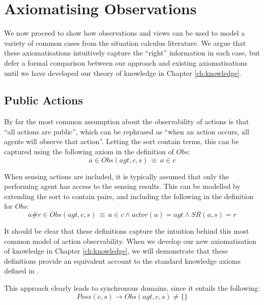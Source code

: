 \section{Axiomatising Observations\label{sec:Observations:Axiomatising-simple}}

We now proceed to show how observations and views can be used to model
a variety of common cases from the situation calculus literature.
We argue that these axiomatisations intuitively capture the {}``right''
information in each case, but defer a formal comparison between our
approach and existing axiomatisations until we have developed our
theory of knowledge in Chapter \ref{ch:knowledge}.


\subsection{Public Actions}

By far the most common assumption about the observability of actions
is that {}``all actions are public'', which can be rephrased as
{}``when an action occurs, all agents will observe that action''.
Letting the sort contain terms, this
can be captured using the following axiom in the definition of $Obs$:\begin{equation}
a\in Obs(agt,c,s)\,\equiv\, a\in c\label{eq:Observations:ObsStd1}\end{equation}


When sensing actions are included, it is typically assumed that only
the performing agent has access to the sensing results. This can be
modelled by extending the  sort to contain 
pairs, and including the following in the definition for $Obs$:\begin{equation}
a\#r\in Obs(agt,c,s)\,\equiv\, a\in c\wedge actor(a)=agt\wedge SR(a,s)=r\label{eq:Observations:ObsStd2}\end{equation}


It should be clear that these definitions capture the intuition behind
this most common model of action observability. When we develop our
new axiomatisation of knowledge in Chapter \ref{ch:knowledge}, we
will demonstrate that these definitions provide an equivalent account
to the standard knowledge axioms defined in \citep{scherl03sc_knowledge}.

This approach clearly leads to synchronous domains, since it entails
the following:\[
Poss(c,s)\rightarrow Obs(agt,c,s)\neq\{\}\]



